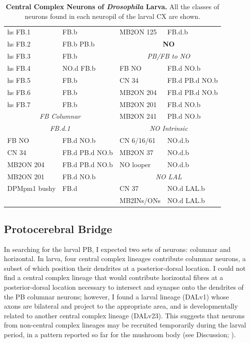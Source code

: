 \begin{table}[H]
{\begin{tabular}{l|l|l|l}
        hs FB.1 & FB.b & MB2ON 125 & FB.d.b \\
        hs FB.2 & FB.b PB.b & \multicolumn{2}{c}{\cellcolor{nohl}\textbf{NO}} \\
        hs FB.3 & FB.b & \multicolumn{2}{c}{\textit{PB/FB to NO}} \\
        hs FB.4 & NO.d FB.b & FB NO & FB.d NO.b \\
        hs FB.5 & FB.b & CN 34 & FB.d PB.d NO.b \\
        hs FB.6 & FB.b & MB2ON 204 & FB.d PB.d NO.b \\
        hs FB.7 & FB.b & MB2ON 201 & FB.d NO.b \\
        \multicolumn{2}{c|}{\textit{FB Columnar}} & MB2ON 241 & PB.d NO.b \\
        \multicolumn{2}{c|}{\textit{FB.d.1}} & \multicolumn{2}{c}{\textit{NO Intrinsic}} \\
        FB NO & FB.d NO.b & CN 6/16/61 & NO.d.b \\
        CN 34 & FB.d PB.d NO.b & MB2ON 37 & NO.d.b \\
        MB2ON 204 & FB.d PB.d NO.b & NO looper & NO.d.b \\
        MB2ON 201 & FB.d NO.b & \multicolumn{2}{c}{\textit{NO LAL}} \\
        DPMpm1 bushy & FB.d & CN 37 & NO.d LAL.b \\
        &  & MB2INs/ONs & NO.d LAL.b \\
        \bottomrule
    \end{tabular}
    }
    \caption[The Neurons of \textit{Drosophila Larva Central Complex}] { \textbf{Central Complex Neurons of \textit{Drosophila} Larva.} All the classes of neurons found in each neuropil of the larval CX are shown.}
    \label{larvalneurons}
\end{table}

    \subsection{Protocerebral Bridge}
    \label{PB}
        In searching for the larval PB, I expected two sets of neurons: columnar and horizontal. In larva, four central complex lineages contribute columnar neurons, a subset of which position their dendrites at a posterior-dorsal location. I could not find a central complex lineage that would contribute horizontal fibres at a posterior-dorsal location necessary to intersect and synapse onto the dendrites of the PB columnar neurons; however, I found a larval lineage (DALv1) whose axons are bilateral and project to the appropriate area, and is developmentally related to another central complex lineage (DALv23). This suggests that neurons from non-central complex lineages may be recruited temporarily during the larval period, in a pattern reported so far for the mushroom body (see Discussion; \citep{truman2023metamorphosis}). 


